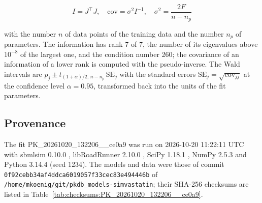 \documentclass{article}
\begin{document}
\begin{equation}
I = J^\top J, \quad \mathrm{cov} = \sigma^2 I^{-1}, \quad \sigma^2 = \frac{2 F}{n - n_p}
\end{equation}

with the number $n$ of data points of the training data and the number $n_p$ of parameters. The information has rank 7 of 7, the number of its eigenvalues above $10^{-8}$ of the largest one, and the condition number 260; the covariance of an information of a lower rank is computed with the pseudo-inverse. The Wald intervals are $\hat{p}_j \pm t_{(1+\alpha)/2,\, n-n_p}\, \mathrm{SE}_j$ with the standard errors $\mathrm{SE}_j = \sqrt{\mathrm{cov}_{jj}}$ at the confidence level $\alpha = 0.95$, transformed back into the units of the fit parameters.

\subsection{Provenance}

The fit PK\_20261020\_132206\_\_ce0a9 was run on 2026-10-20 11:22:11 UTC with sbmlsim 0.10.0 \cite{Koenig2026_sbmlsim}, libRoadRunner 2.10.0 \cite{Welsh2023}, SciPy 1.18.1 \cite{Virtanen2020}, NumPy 2.5.3 \cite{Harris2020} and Python 3.14.4 (seed 1234). The models and data were those of commit \texttt{0f92cebb34af4ddca6019057f33cec83e494446b} of \texttt{/home/mkoenig/git/pkdb\_models-simvastatin}; their SHA-256 checksums are listed in Table~\ref{tab:checksums:PK_20261020_132206__ce0a9}.
\end{document}
